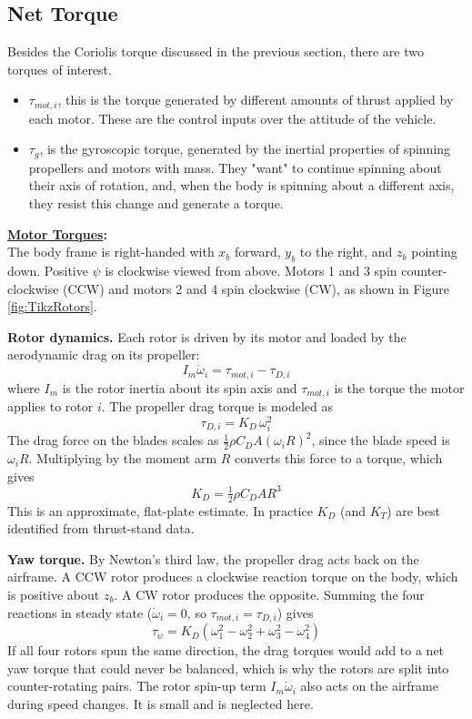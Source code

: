 \documentclass[conf]{new-aiaa}
\begin{document}
\subsection{Net Torque}
Besides the Coriolis torque discussed in the previous section, there are two torques of interest. 
\begin{itemize}
    \item $\tau_{mot,i}$, this is the torque generated by different amounts of thrust applied by each motor. These are the control inputs over the attitude of the vehicle. 
    \item $\tau_g$, is the gyroscopic torque, generated by the inertial properties of spinning propellers and motors with mass. They "want" to continue spinning about their axis of rotation, and, when the body is spinning about a different axis, they resist this change and generate a torque.
\end{itemize}
\noindent\textbf{\ul{Motor Torques}:}\vspace{0.22 cm}\\
The body frame is right-handed with $x_b$ forward, $y_b$ to the right, and $z_b$ pointing down. Positive $\psi$ is clockwise viewed from above. Motors 1 and 3 spin counter-clockwise (CCW) and motors 2 and 4 spin clockwise (CW), as shown in Figure \ref{fig:TikzRotors}.

\vspace{0.2cm}
\noindent\textbf{Rotor dynamics.} Each rotor is driven by its motor and loaded by the aerodynamic drag on its propeller:
$$I_m \dot{\omega}_i = \tau_{mot,i} - \tau_{D,i}$$
where $I_m$ is the rotor inertia about its spin axis and $\tau_{mot,i}$ is the torque the motor applies to rotor $i$. The propeller drag torque is modeled as
$$\tau_{D,i} = K_D\,\omega_i^2$$
The drag force on the blades scales as $\tfrac{1}{2}\rho C_D A (\omega_i R)^2$, since the blade speed is $\omega_i R$. Multiplying by the moment arm $R$ converts this force to a torque, which gives
$$K_D = \tfrac{1}{2}\rho C_D A R^3$$
This is an approximate, flat-plate estimate. In practice $K_D$ (and $K_T$) are best identified from thrust-stand data.

\vspace{0.2cm}
\noindent\textbf{Yaw torque.} By Newton's third law, the propeller drag acts back on the airframe. A CCW rotor produces a clockwise reaction torque on the body, which is positive about $z_b$. A CW rotor produces the opposite. Summing the four reactions in steady state ($\dot\omega_i = 0$, so $\tau_{mot,i} = \tau_{D,i}$) gives
$$\tau_\psi = K_D\left(\omega_1^2-\omega_2^2+\omega_3^2-\omega_4^2\right)$$
If all four rotors spun the same direction, the drag torques would add to a net yaw torque that could never be balanced, which is why the rotors are split into counter-rotating pairs. The rotor spin-up term $I_m\dot\omega_i$ also acts on the airframe during speed changes. It is small and is neglected here.
\end{document}
